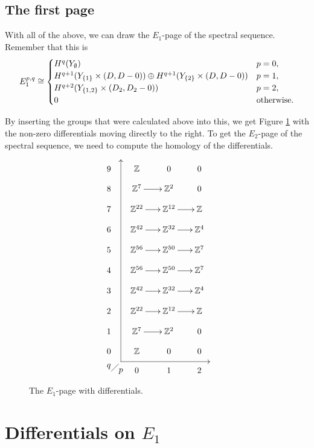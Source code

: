 \subsection{The first page}

With all of the above, we can draw the $E_1$-page of the spectral
sequence. Remember that this is
\[ E_1^{p,q} \cong
\begin{cases}
  H^{q}(Y_\emptyset) & p=0, \\
  H^{q+1}(Y_{\left\{ 1 \right\}} \times (D,D-0)) \oplus H^{q+1}(Y_{\left\{ 2 \right\}} \times
  (D,D-0)) & p=1, \\
  H^{q+2}(Y_{\left\{ 1,2 \right\}}\times (D_2,D_2-0)) & p = 2, \\
  0 & \text{otherwise}.
\end{cases} \]

By inserting the groups that were calculated above into this, we get
Figure \ref{fig:e1} with the non-zero differentials moving directly to
the right. To get the $E_2$-page of the spectral sequence, we need to
compute the homology of the differentials.

\begin{figure}[ht]
  \[ \xy
  (5,4); (5,-80); **\dir{-}; (5,4); *\dir{>};
  (5,-80); (42,-80); **\dir{-}; *\dir{<};
  (0,-82)*{q}; (5,-84)*{p};
  (1,-84); (4,-81); **\dir{-};
  (0,0)\xymatrix@R=1em@C=1.7em{
    9 & \Z & 0 & 0 \\
    8 & \Z^7 \ar[r]& \Z^2 & 0 \\
    7 & \Z^{22} \ar[r]& \Z^{12} \ar[r]& \Z \\
    6 & \Z^{42} \ar[r]& \Z^{32} \ar[r]& \Z^{4} \\
    5 & \Z^{56} \ar[r]& \Z^{50} \ar[r]& \Z^{7} \\
    4 & \Z^{56} \ar[r]& \Z^{50} \ar[r]& \Z^{7} \\
    3 & \Z^{42} \ar[r]& \Z^{32} \ar[r]& \Z^{4} \\
    2 & \Z^{22} \ar[r]& \Z^{12} \ar[r]& \Z \\
    1 & \Z^{7} \ar[r]& \Z^{2} & 0 \\
    0 & \Z & 0 & 0 \\
    & 0 & 1 & 2
  } \endxy \]
  \caption{The $E_1$-page with differentials.}
  \label{fig:e1}
\end{figure}

\section{Differentials on $E_1$}
\label{sec:orientation}

